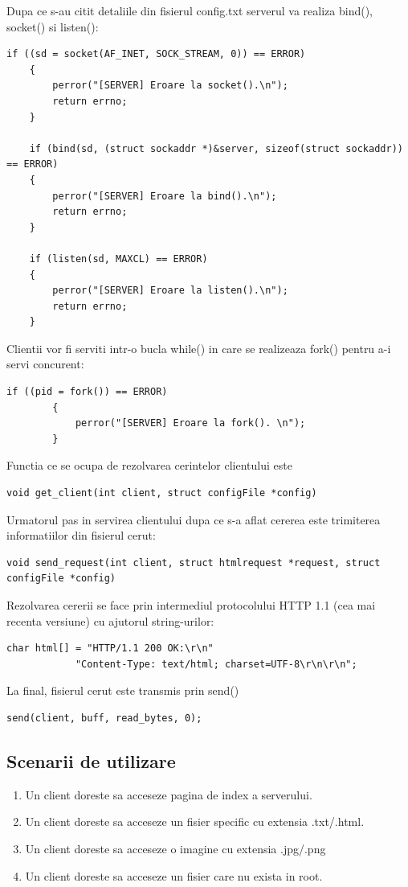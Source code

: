 \documentclass{llncs}
\begin{document}
Dupa ce s-au citit detaliile din fisierul config.txt serverul va realiza bind(), socket() si listen():
\begin{lstlisting}[style=CStyle]
    if ((sd = socket(AF_INET, SOCK_STREAM, 0)) == ERROR)
    {
        perror("[SERVER] Eroare la socket().\n");
        return errno;
    }

    if (bind(sd, (struct sockaddr *)&server, sizeof(struct sockaddr)) == ERROR)
    {
        perror("[SERVER] Eroare la bind().\n");
        return errno;
    }

    if (listen(sd, MAXCL) == ERROR)
    {
        perror("[SERVER] Eroare la listen().\n");
        return errno;
    }
\end{lstlisting}
Clientii vor fi serviti intr-o bucla while() in care se realizeaza fork() pentru a-i servi concurent:
\begin{lstlisting}[style=CStyle]
	if ((pid = fork()) == ERROR)
        {
            perror("[SERVER] Eroare la fork(). \n");
        }
\end{lstlisting}
Functia ce se ocupa de rezolvarea cerintelor clientului este
\begin{lstlisting}[style=CStyle]
void get_client(int client, struct configFile *config)
\end{lstlisting}

Urmatorul pas in servirea clientului dupa ce s-a aflat cererea este trimiterea informatiilor din fisierul cerut:

\begin{lstlisting}[style=CStyle]
void send_request(int client, struct htmlrequest *request, struct configFile *config)
\end{lstlisting}

Rezolvarea cererii se face prin intermediul protocolului HTTP 1.1 (cea mai recenta versiune) cu ajutorul string-urilor:
\begin{lstlisting}[style=CStyle]
    char html[] = "HTTP/1.1 200 OK:\r\n"
            "Content-Type: text/html; charset=UTF-8\r\n\r\n";
\end{lstlisting}

La final, fisierul cerut este transmis prin send()
\begin{lstlisting}[style=CStyle]
send(client, buff, read_bytes, 0);
\end{lstlisting}




\subsection{Scenarii de utilizare}
\begin{enumerate}
  \item Un client doreste sa acceseze pagina de index a serverului.
  \item Un client doreste sa acceseze un fisier specific cu extensia .txt/.html.
  \item Un client doreste sa acceseze o imagine cu extensia .jpg/.png
  \item Un client doreste sa acceseze un fisier care nu exista in root.
\end{enumerate}
\end{document}
